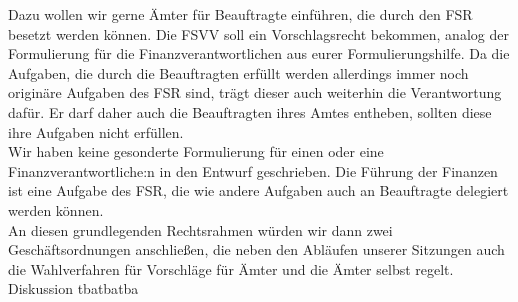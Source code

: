 {        Dazu wollen wir gerne Ämter für Beauftragte einführen, die durch den FSR besetzt werden können. Die FSVV soll ein
        Vorschlagsrecht bekommen, analog der Formulierung für die Finanzverantwortlichen aus eurer Formulierungshilfe.
        Da die Aufgaben, die durch die Beauftragten erfüllt werden allerdings immer noch originäre Aufgaben des FSR sind,
        trägt dieser auch weiterhin die Verantwortung dafür. Er darf daher auch die Beauftragten ihres Amtes entheben,
        sollten diese ihre Aufgaben nicht erfüllen.\\
        Wir haben keine gesonderte Formulierung für einen oder eine Finanzverantwortliche:n in den Entwurf geschrieben.
        Die Führung der Finanzen ist eine Aufgabe des FSR, die wie andere Aufgaben auch an Beauftragte delegiert werden können.\\
        An diesen grundlegenden Rechtsrahmen würden wir dann zwei Geschäftsordnungen anschließen,
        die neben den Abläufen unserer Sitzungen auch die Wahlverfahren für Vorschläge für Ämter und die Ämter selbst regelt.
    }{
        Diskussion
    }{tba}{tba}{tba}
    
